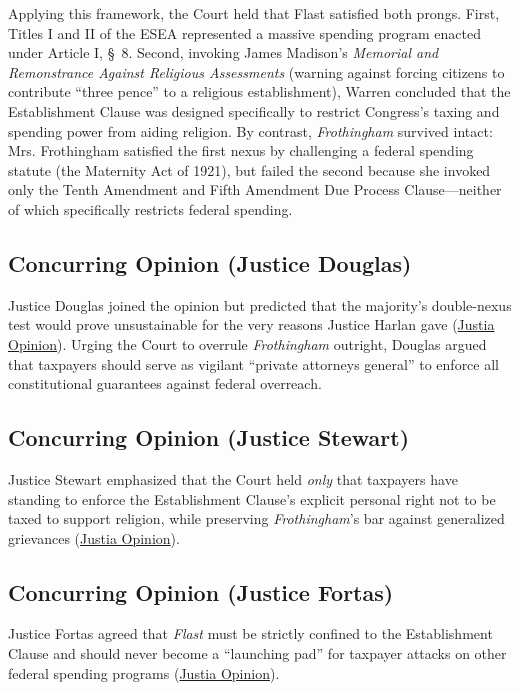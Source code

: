 \documentclass[12pt]{article}
\begin{document}
Applying this framework, the Court held that Flast satisfied both prongs. First, Titles I and II of the ESEA represented a massive spending program enacted under Article I, \S\ 8. Second, invoking James Madison's \textit{Memorial and Remonstrance Against Religious Assessments} (warning against forcing citizens to contribute ``three pence'' to a religious establishment), Warren concluded that the Establishment Clause was designed specifically to restrict Congress's taxing and spending power from aiding religion. By contrast, \textit{Frothingham} survived intact: Mrs. Frothingham satisfied the first nexus by challenging a federal spending statute (the Maternity Act of 1921), but failed the second because she invoked only the Tenth Amendment and Fifth Amendment Due Process Clause---neither of which specifically restricts federal spending.

\subsection{Concurring Opinion (Justice Douglas)}

Justice Douglas joined the opinion but predicted that the majority's double-nexus test would prove unsustainable for the very reasons Justice Harlan gave (\href{https://supreme.justia.com/cases/federal/us/392/83/}{Justia Opinion}). Urging the Court to overrule \textit{Frothingham} outright, Douglas argued that taxpayers should serve as vigilant ``private attorneys general'' to enforce all constitutional guarantees against federal overreach.

\subsection{Concurring Opinion (Justice Stewart)}

Justice Stewart emphasized that the Court held \textit{only} that taxpayers have standing to enforce the Establishment Clause's explicit personal right not to be taxed to support religion, while preserving \textit{Frothingham}'s bar against generalized grievances (\href{https://supreme.justia.com/cases/federal/us/392/83/}{Justia Opinion}).

\subsection{Concurring Opinion (Justice Fortas)}

Justice Fortas agreed that \textit{Flast} must be strictly confined to the Establishment Clause and should never become a ``launching pad'' for taxpayer attacks on other federal spending programs (\href{https://supreme.justia.com/cases/federal/us/392/83/}{Justia Opinion}).
\end{document}
